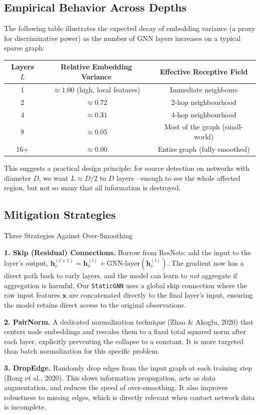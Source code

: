 \subsection{Empirical Behavior Across Depths}

The following table illustrates the expected decay of embedding variance (a proxy for discriminative power) as the number of GNN layers increases on a typical sparse graph:

\begin{center}
\renewcommand{\arraystretch}{1.4}
\begin{tabular}{ccc}
\toprule
\textbf{Layers $L$} & \textbf{Relative Embedding Variance} & \textbf{Effective Receptive Field} \\
\midrule
1 & $\approx 1.00$ (high, local features) & Immediate neighbours \\
2 & $\approx 0.72$ & 2-hop neighbourhood \\
4 & $\approx 0.31$ & 4-hop neighbourhood \\
8 & $\approx 0.05$ & Most of the graph (small-world) \\
16+ & $\approx 0.00$ & Entire graph (fully smoothed) \\
\bottomrule
\end{tabular}
\end{center}

This suggests a practical design principle: for source detection on networks with diameter $D$, we want $L \approx D/2$ to $D$ layers---enough to see the whole affected region, but not so many that all information is destroyed.

\subsection{Mitigation Strategies}

\begin{conceptbox}{Three Strategies Against Over-Smoothing}

\textbf{1. Skip (Residual) Connections.} Borrow from ResNets: add the input to the layer's output, $\mathbf{h}_v^{(l+1)} = \mathbf{h}_v^{(l)} + \text{GNN-layer}(\mathbf{h}_v^{(l)})$. The gradient now has a direct path back to early layers, and the model can learn to \emph{not} aggregate if aggregation is harmful. Our \texttt{StaticGNN} uses a global skip connection where the raw input features $\mathbf{x}$ are concatenated directly to the final layer's input, ensuring the model retains direct access to the original observations.

\textbf{2. PairNorm.} A dedicated normalization technique (Zhao \& Akoglu, 2020) that centers node embeddings and rescales them to a fixed total squared norm after each layer, explicitly preventing the collapse to a constant. It is more targeted than batch normalization for this specific problem.

\textbf{3. DropEdge.} Randomly drop edges from the input graph at each training step (Rong et al., 2020). This slows information propagation, acts as data augmentation, and reduces the speed of over-smoothing. It also improves robustness to missing edges, which is directly relevant when contact network data is incomplete.
\end{conceptbox}

